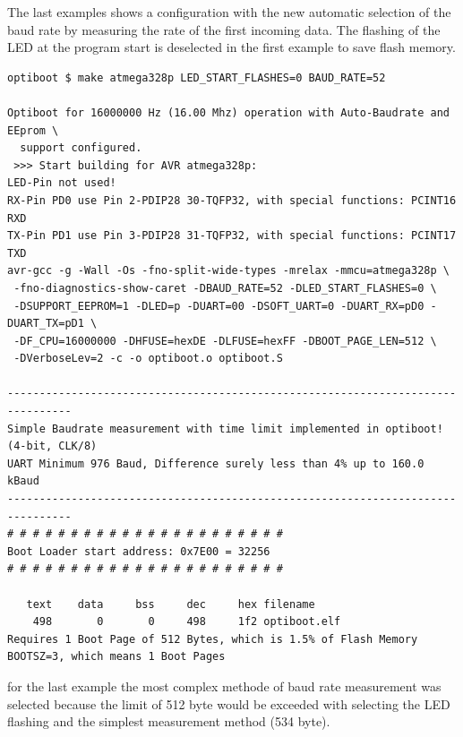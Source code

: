 The last examples shows a configuration with the new automatic selection of the baud rate
by measuring the rate of the first incoming data.
The flashing of the LED at the program start is deselected in the first example to save flash memory.

\begin{verbatim}
optiboot $ make atmega328p LED_START_FLASHES=0 BAUD_RATE=52

Optiboot for 16000000 Hz (16.00 Mhz) operation with Auto-Baudrate and EEprom \
  support configured.
 >>> Start building for AVR atmega328p:
LED-Pin not used!
RX-Pin PD0 use Pin 2-PDIP28 30-TQFP32, with special functions: PCINT16 RXD
TX-Pin PD1 use Pin 3-PDIP28 31-TQFP32, with special functions: PCINT17 TXD
avr-gcc -g -Wall -Os -fno-split-wide-types -mrelax -mmcu=atmega328p \
 -fno-diagnostics-show-caret -DBAUD_RATE=52 -DLED_START_FLASHES=0 \
 -DSUPPORT_EEPROM=1 -DLED=p -DUART=00 -DSOFT_UART=0 -DUART_RX=pD0 -DUART_TX=pD1 \
 -DF_CPU=16000000 -DHFUSE=hexDE -DLFUSE=hexFF -DBOOT_PAGE_LEN=512 \
 -DVerboseLev=2 -c -o optiboot.o optiboot.S

--------------------------------------------------------------------------------
Simple Baudrate measurement with time limit implemented in optiboot! (4-bit, CLK/8)
UART Minimum 976 Baud, Difference surely less than 4% up to 160.0 kBaud
--------------------------------------------------------------------------------
# # # # # # # # # # # # # # # # # # # # # #
Boot Loader start address: 0x7E00 = 32256
# # # # # # # # # # # # # # # # # # # # # #

   text    data     bss     dec     hex filename
    498       0       0     498     1f2 optiboot.elf
Requires 1 Boot Page of 512 Bytes, which is 1.5% of Flash Memory
BOOTSZ=3, which means 1 Boot Pages

\end{verbatim}


for the last example the most complex methode of baud rate measurement
was selected because the limit of 512 byte would be exceeded with
selecting the LED flashing and the simplest measurement method (534 byte).

